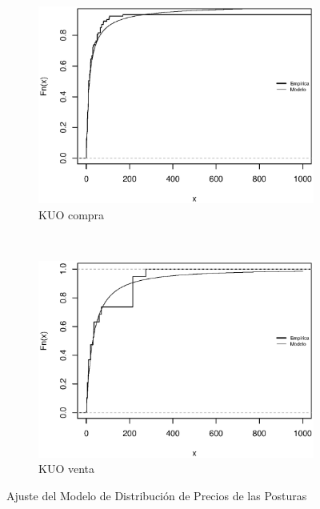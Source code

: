 \documentclass[11pt]{article}
\numberwithin{equation}{section} %
\begin{document}
\begin{figure}[htbp]
\begin{subfigure}[b]{0.5\textwidth}
\centering
\includegraphics[width=\textwidth, trim=0 0.5cm 0 1cm]{kuocompra.eps}
\caption{KUO compra}
\label{fig:kuocompra}
\end{subfigure}%
~ %
\begin{subfigure}[b]{0.5\textwidth}
\centering
\includegraphics[width=\textwidth, trim=0 0.5cm 0 1cm]{kuoventa.eps}
\caption{KUO venta}
\label{fig:kuoventa}
\end{subfigure}

\caption{Ajuste del Modelo de Distribución de Precios de las Posturas}
\label{fig:precios}
\end{figure}
\end{document}
